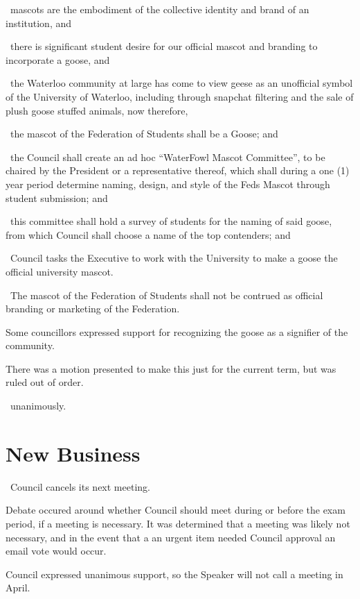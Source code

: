 \begin{motion}
    \whereas\ mascots are the embodiment of the collective identity and
    brand of an institution, and

    \whereas\ there is significant student desire for our official mascot
    and branding to incorporate a goose, and

    \whereas\ the Waterloo community at large has come to view geese as an
    unofficial symbol of the University of Waterloo, including through
    snapchat filtering and the sale of plush goose stuffed animals, now
    therefore,

    \birt\ the mascot of the Federation of Students shall be a Goose; and

    \bifrt\ the Council shall create an ad hoc “WaterFowl Mascot
    Committee”, to be chaired by the President or a representative
    thereof, which shall during a one (1) year period determine naming,
    design, and style of the Feds Mascot through student submission; and

    \bifrt\ this committee shall hold a survey of students for the naming
    of said goose, from which Council shall choose a name of the top
    contenders; and

    \bifrt\ Council tasks the Executive to work with the University to make
    a goose the official university mascot. 

    \bifrt\ The mascot of the Federation of Students shall not be contrued as
    official branding or marketing of the Federation.

    \movers{\seneca}{\jennifer}

    Some councillors expressed support for recognizing the goose as a signifier
    of the community.

    There was a motion presented to make this just for the current term, but
    was ruled out of order. 
    
    \carries\ unanimously. 
\end{motion}

\section*{New Business}

\begin{motion}
    \birt\ Council cancels its next meeting.

    Debate occured around whether Council should meet during or before the exam
    period, if a meeting is necessary. It was determined that a meeting was
    likely not necessary, and in the event that a an urgent item needed 
    Council approval an email vote would occur.

    Council expressed unanimous support, so the Speaker will not call a meeting
    in April.
\end{motion}


